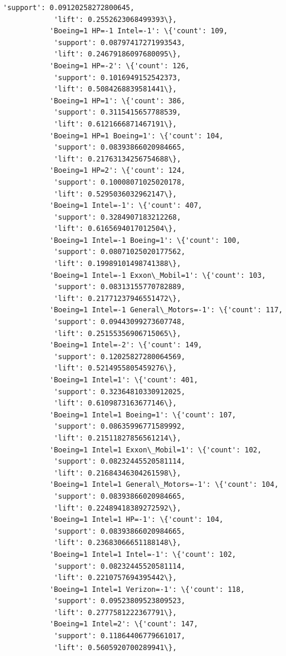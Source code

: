 \documentclass[11pt]{article}
\begin{document}
\begin{Verbatim}[commandchars=\\\{\}]
            'support': 0.09120258272800645,
            'lift': 0.2552623068499393\},
           'Boeing=1 HP=-1 Intel=-1': \{'count': 109,
            'support': 0.08797417271993543,
            'lift': 0.24679186097680095\},
           'Boeing=1 HP=-2': \{'count': 126,
            'support': 0.1016949152542373,
            'lift': 0.5084268839581441\},
           'Boeing=1 HP=1': \{'count': 386,
            'support': 0.3115415657788539,
            'lift': 0.6121666871467191\},
           'Boeing=1 HP=1 Boeing=1': \{'count': 104,
            'support': 0.08393866020984665,
            'lift': 0.21763134256754688\},
           'Boeing=1 HP=2': \{'count': 124,
            'support': 0.10008071025020178,
            'lift': 0.5295036032962147\},
           'Boeing=1 Intel=-1': \{'count': 407,
            'support': 0.3284907183212268,
            'lift': 0.6165694017012504\},
           'Boeing=1 Intel=-1 Boeing=1': \{'count': 100,
            'support': 0.08071025020177562,
            'lift': 0.19989101498741388\},
           'Boeing=1 Intel=-1 Exxon\_Mobil=1': \{'count': 103,
            'support': 0.08313155770782889,
            'lift': 0.21771237946551472\},
           'Boeing=1 Intel=-1 General\_Motors=-1': \{'count': 117,
            'support': 0.09443099273607748,
            'lift': 0.25155356906715065\},
           'Boeing=1 Intel=-2': \{'count': 149,
            'support': 0.12025827280064569,
            'lift': 0.5214955805459276\},
           'Boeing=1 Intel=1': \{'count': 401,
            'support': 0.32364810330912025,
            'lift': 0.6109873163677146\},
           'Boeing=1 Intel=1 Boeing=1': \{'count': 107,
            'support': 0.08635996771589992,
            'lift': 0.21511827856561214\},
           'Boeing=1 Intel=1 Exxon\_Mobil=1': \{'count': 102,
            'support': 0.08232445520581114,
            'lift': 0.21684346304261598\},
           'Boeing=1 Intel=1 General\_Motors=-1': \{'count': 104,
            'support': 0.08393866020984665,
            'lift': 0.22489418389272592\},
           'Boeing=1 Intel=1 HP=-1': \{'count': 104,
            'support': 0.08393866020984665,
            'lift': 0.23683066651188148\},
           'Boeing=1 Intel=1 Intel=-1': \{'count': 102,
            'support': 0.08232445520581114,
            'lift': 0.2210757694395442\},
           'Boeing=1 Intel=1 Verizon=-1': \{'count': 118,
            'support': 0.09523809523809523,
            'lift': 0.2777581222367791\},
           'Boeing=1 Intel=2': \{'count': 147,
            'support': 0.11864406779661017,
            'lift': 0.5605920700289941\},

\end{Verbatim}
\end{document}
